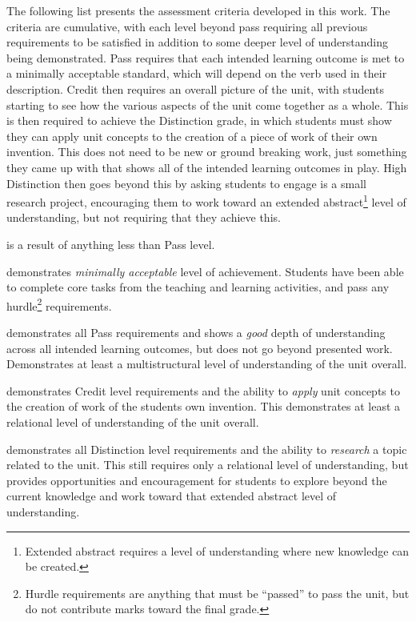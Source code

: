 The following list presents the assessment criteria developed in this work. The criteria are cumulative, with each level beyond pass requiring all previous requirements to be satisfied in addition to some deeper level of understanding being demonstrated. Pass requires that each intended learning outcome is met to a minimally acceptable standard, which will depend on the verb used in their description. Credit then requires an overall picture of the unit, with students starting to see how the various aspects of the unit come together as a whole. This is then required to achieve the Distinction grade, in which students must show they can apply unit concepts to the creation of a piece of work of their own invention. This does not need to be new or ground breaking work, just something they came up with that shows all of the intended learning outcomes in play. High Distinction then goes beyond this by asking students to engage is a small research project, encouraging them to work toward an extended abstract\footnote{Extended abstract requires a level of understanding where new knowledge can be created.} level of understanding, but not requiring that they achieve this.
\begin{description}
	\item[Fail] is a result of anything less than Pass level.
	\item[Pass] demonstrates \emph{minimally acceptable} level of achievement. Students have been able to complete core tasks from the teaching and learning activities, and pass any hurdle\footnote{Hurdle requirements are anything that must be ``passed'' to pass the unit, but do not contribute marks toward the final grade.} requirements.
	\item[Credit] demonstrates all Pass requirements and shows a \emph{good} depth of understanding across all intended learning outcomes, but does not go beyond presented work. Demonstrates at least a multistructural level of understanding of the unit overall.
	\item[Distinction] demonstrates Credit level requirements and the ability to \emph{apply} unit concepts to the creation of work of the students own invention. This demonstrates at least a relational level of understanding of the unit overall.
	\item[High Distinction] demonstrates all Distinction level requirements and the ability to \emph{research} a topic related to the unit. This still requires only a relational level of understanding, but provides opportunities and encouragement for students to explore beyond the current knowledge and work toward that extended abstract level of understanding.
\end{description}

